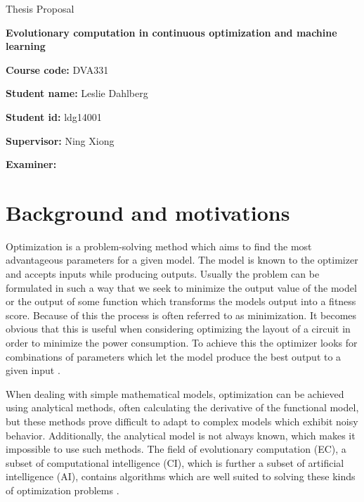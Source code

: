 \documentclass[12pt, titlepage, a4paper]{article}
\begin{document}
\begin{center}
  \LARGE
  Thesis Proposal

  \LARGE
  \textbf{Evolutionary computation in continuous optimization and machine learning}

\end{center}

\vspace{1cm}

\large
\noindent
\textbf{Course code:} DVA331

\large
\noindent
\textbf{Student name:} Leslie Dahlberg

\large
\noindent
\textbf{Student id:} ldg14001

\large
\noindent
\textbf{Supervisor:} Ning Xiong

\large
\noindent
\textbf{Examiner:}

\normalsize


\section{Background and motivations}

Optimization is a problem-solving method which aims to find the most advantageous parameters for a given model. The model is known to the optimizer and accepts inputs while producing outputs. Usually the problem can be formulated in such a way that we seek to minimize the output value of the model or the output of some function which transforms the models output into a fitness score. Because of this the process is often referred to as minimization. It becomes obvious that this is useful when considering optimizing the layout of a circuit in order to minimize the power consumption. To achieve this the optimizer looks for combinations of parameters which let the model produce the best output to a given input \cite{Eiben2015_origins}.


When dealing with simple mathematical models, optimization can be achieved using analytical methods, often calculating the derivative of the functional model, but these methods prove difficult to adapt to complex models which exhibit noisy behavior. Additionally, the analytical model is not always known, which makes it impossible to use such methods. The field of evolutionary computation (EC), a subset of computational intelligence (CI), which is further a subset of artificial intelligence (AI), contains algorithms which are well suited to solving these kinds of optimization problems \cite{Michalewicz1997,zhang2015comprehensive}.
\end{document}
